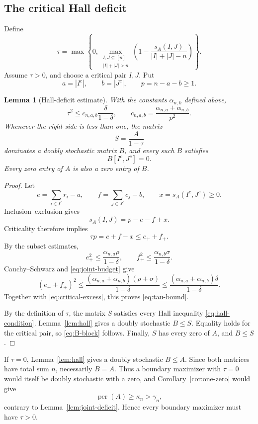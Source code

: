 \documentclass[11pt]{article}
\newtheorem{lemma}[theorem]{Lemma}
\theoremstyle{definition}
\newcommand{\per}{\operatorname{per}}
\newcommand{\1}{\mathbf{1}}
\begin{document}
\subsection{The critical Hall deficit}

Define
\[
 \tau=
 \max\left\{
 0,
 \max_{\substack{I,J\subseteq[n]\\|I|+|J|>n}}
 \left(
 1-\frac{s_A(I,J)}{|I|+|J|-n}
 \right)
 \right\}.
 \tag{5.18}\label{eq:tau}
\]
Assume $\tau>0$, and choose a critical pair $I,J$.  Put
\[
 a=|I^c|,
 \qquad
 b=|J^c|,
 \qquad
 p=n-a-b\ge1.
 \tag{5.19}\label{eq:abp}
\]

\begin{lemma}[Hall-deficit estimate]\label{lem:hall-deficit}
With the constants $\alpha_{n,k}$ defined above,
\[
 \tau^2\le c_{n,a,b}\frac{\delta}{1-\delta},
 \qquad
 c_{n,a,b}=
 \frac{\alpha_{n,a}+\alpha_{n,b}}{p^2}.
 \tag{5.20}\label{eq:tau-bound}
\]
Whenever the right side is less than one, the matrix
\[
 S=\frac{A}{1-\tau}
 \tag{5.21}\label{eq:S-dilation}
\]
dominates a doubly stochastic matrix $B$, and every such $B$ satisfies
\[
 B[I^c,J^c]=0.
 \tag{5.22}\label{eq:B-block}
\]
Every zero entry of $A$ is also a zero entry of $B$.
\end{lemma}

\begin{proof}
Let
\[
 e=\sum_{i\in I^c}r_i-a,
 \qquad
 f=\sum_{j\in J^c}c_j-b,
 \qquad
 x=s_A(I^c,J^c)\ge0.
\]
Inclusion--exclusion gives
\[
 s_A(I,J)=p-e-f+x.
\]
Criticality therefore implies
\[
 \tau p=e+f-x\le e_++f_+.
 \tag{5.23}\label{eq:critical-excess}
\]
By the subset estimates,
\[
 e_+^2\le\frac{\alpha_{n,a}\rho}{1-\delta},
 \qquad
 f_+^2\le\frac{\alpha_{n,b}\sigma}{1-\delta}.
\]
Cauchy--Schwarz and \eqref{eq:joint-budget} give
\[
 (e_++f_+)^2
 \le\frac{(\alpha_{n,a}+\alpha_{n,b})(\rho+\sigma)}{1-\delta}
 \le\frac{(\alpha_{n,a}+\alpha_{n,b})\delta}{1-\delta}.
\]
Together with \eqref{eq:critical-excess}, this proves \eqref{eq:tau-bound}.

By the definition of $\tau$, the matrix $S$ satisfies every Hall inequality \eqref{eq:hall-condition}.  Lemma~\ref{lem:hall} gives a doubly stochastic $B\le S$.  Equality holds for the critical pair, so \eqref{eq:B-block} follows.  Finally, $S$ has every zero of $A$, and $B\le S$.
\end{proof}

If $\tau=0$, Lemma~\ref{lem:hall} gives a doubly stochastic $B\le A$.  Since both matrices have total sum $n$, necessarily $B=A$.  Thus a boundary maximizer with $\tau=0$ would itself be doubly stochastic with a zero, and Corollary~\ref{cor:one-zero} would give
\[
 \per(A)\ge\kappa_n>\gamma_n,
\]
contrary to Lemma~\ref{lem:joint-deficit}.  Hence every boundary maximizer must have $\tau>0$.
\end{document}

